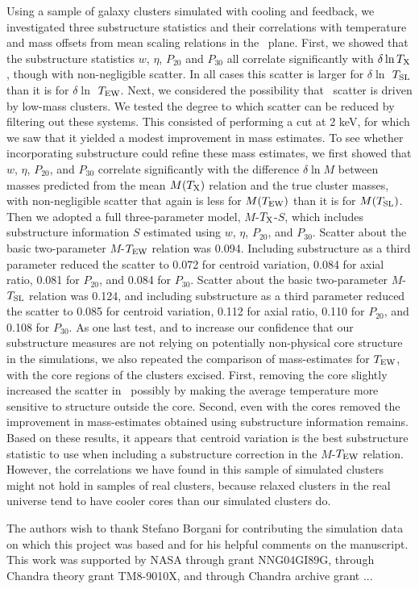 \documentclass{aastex} \usepackage{natbib}
\begin{document}
Using a sample of galaxy clusters simulated with cooling and feedback,
we investigated three substructure statistics and their correlations
with temperature and mass offsets from mean scaling relations in the
\mtx\ plane.  First, we showed that the substructure statistics $w$,
$\eta$, $P_{20}$ and $P_{30}$ all correlate significantly with $\delta
\ln T_{\rm X}$, though with non-negligible scatter.  In all cases this
scatter is larger for $\delta \ln$ $T_{\rm SL}$ than it is for $\delta \ln$
$T_{\rm EW}$.  Next, we considered the possibility that \mtx\ scatter is
driven by low-mass clusters.  We tested the degree to which scatter
can be reduced by filtering out these systems.  This consisted of
performing a cut at 2 keV, for which we saw that it yielded a modest
improvement in mass estimates.  To see whether incorporating
substructure could refine these mass estimates, we first showed that
$w$, $\eta$, $P_{20}$, and $P_{30}$ correlate significantly with the
difference $\delta \ln M$ between masses predicted from the mean
$M(T_{\rm X})$ relation and the true cluster masses, with non-negligible
scatter that again is less for $M(T_{\rm EW})$ than it is for $M(T_{\rm SL})$.
Then we adopted a full three-parameter model, $M$-$T_{\rm X}$-$S$, which
includes substructure information $S$ estimated using $w$, $\eta$,
$P_{20}$, and $P_{30}$. Scatter about the basic two-parameter
$M$-$T_{\rm EW}$ relation was 0.094.  Including substructure as a third
parameter reduced the scatter to 0.072 for centroid variation, 0.084
for axial ratio, 0.081 for $P_{20}$, and 0.084 for $P_{30}$.  Scatter
about the basic two-parameter $M$-$T_{\rm SL}$ relation was 0.124, and
including substructure as a third parameter reduced the scatter to
0.085 for centroid variation, 0.112 for axial ratio, 0.110 for
$P_{20}$, and 0.108 for $P_{30}$.  As one last test, and to increase
our confidence that our substructure measures are not relying on
potentially non-physical core structure in the simulations, we also
repeated the comparison of mass-estimates for $T_{\rm EW}$, with the core
regions of the clusters excised.  First, removing the core slightly
increased the scatter in \mtx\, possibly by making the average
temperature more sensitive to structure outside the core.  Second,
even with the cores removed the improvement in mass-estimates obtained
using substructure information remains.  Based on these results, it
appears that centroid variation is the best substructure statistic to
use when including a substructure correction in the $M$-$T_{\rm EW}$
relation.  However, the correlations we have found in this sample of
simulated clusters might not hold in samples of real clusters, because
relaxed clusters in the real universe tend to have cooler cores than
our simulated clusters do.

\acknowledgments
The authors wish to thank Stefano Borgani for contributing the simulation data
on which this project was based and for his helpful comments on the manuscript.    
This work was supported by NASA through grant NNG04GI89G, through
Chandra theory grant TM8-9010X, and through Chandra archive grant ...


\end{document}
